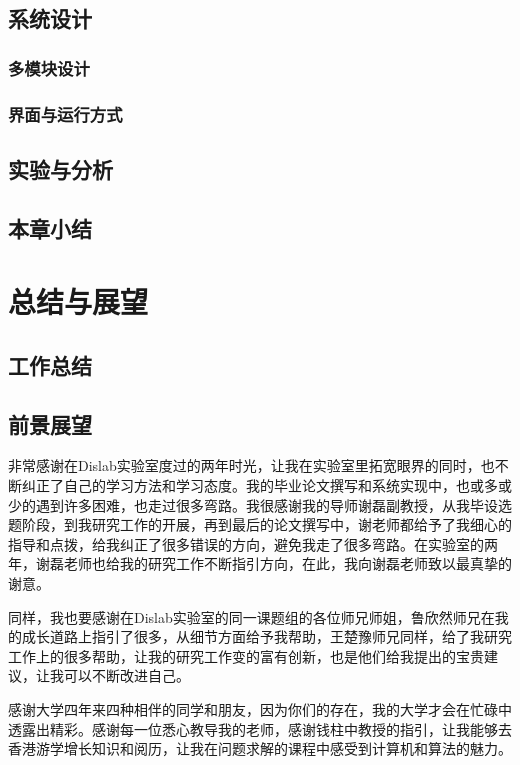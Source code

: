 \documentclass[winfonts]{njuthesis}
\begin{document}
	\section{系统设计}
		\subsection{多模块设计}
		\subsection{界面与运行方式}
	\section{实验与分析}
	\section{本章小结}
\chapter{总结与展望}
	\section{工作总结}
	\section{前景展望}

	\begin{acknowledgement}
		
		非常感谢在Dislab实验室度过的两年时光，让我在实验室里拓宽眼界的同时，也不断纠正了自己的学习方法和学习态度。我的毕业论文撰写和系统实现中，也或多或少的遇到许多困难，也走过很多弯路。我很感谢我的导师谢磊副教授，从我毕设选题阶段，到我研究工作的开展，再到最后的论文撰写中，谢老师都给予了我细心的指导和点拨，给我纠正了很多错误的方向，避免我走了很多弯路。在实验室的两年，谢磊老师也给我的研究工作不断指引方向，在此，我向谢磊老师致以最真挚的谢意。
		
		同样，我也要感谢在Dislab实验室的同一课题组的各位师兄师姐，鲁欣然师兄在我的成长道路上指引了很多，从细节方面给予我帮助，王楚豫师兄同样，给了我研究工作上的很多帮助，让我的研究工作变的富有创新，也是他们给我提出的宝贵建议，让我可以不断改进自己。
		
		感谢大学四年来四种相伴的同学和朋友，因为你们的存在，我的大学才会在忙碌中透露出精彩。感谢每一位悉心教导我的老师，感谢钱柱中教授的指引，让我能够去香港游学增长知识和阅历，让我在问题求解的课程中感受到计算机和算法的魅力。
		
	\end{acknowledgement}
\end{document}
